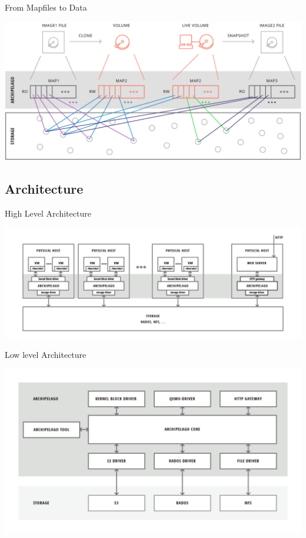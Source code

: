 \documentclass[utf8]{beamer}
\begin{document}
\begin{frame}{From Mapfiles to Data}

  \begin{center}
    \includegraphics[width=.90\linewidth]{figures/mapfiles.png}
  \end{center}

\end{frame}

\subsection{Architecture}

\begin{frame}{High Level Architecture}

  \begin{center}
    \includegraphics[width=.90\linewidth]{figures/high-architecture.png}
  \end{center}
  
\end{frame}

\begin{frame}{Low level Architecture}

  \begin{center}
    \includegraphics[width=.90\linewidth]{figures/low-architecture.png}
  \end{center}
  
\end{frame}
\end{document}
